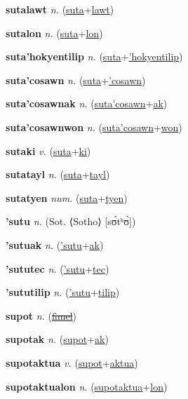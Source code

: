 \textbf{\hypertarget{sutalawt}{sutalawt}} \textit{n.} (\hyperlink{suta}{suta}+\allowbreak \hyperlink{lawt}{lawt})


\textbf{\hypertarget{sutalon}{sutalon}} \textit{n.} (\hyperlink{suta}{suta}+\allowbreak \hyperlink{lon}{lon})


\textbf{\hypertarget{suta'hokyentilip}{suta'hokyentilip}} \textit{n.} (\hyperlink{suta}{suta}+\allowbreak \hyperlink{'hokyentilip}{'hokyentilip})


\textbf{\hypertarget{suta'cosawn}{suta'cosawn}} \textit{n.} (\hyperlink{suta}{suta}+\allowbreak \hyperlink{'cosawn}{'cosawn})


\textbf{\hypertarget{suta'cosawnak}{suta'cosawnak}} \textit{n.} (\hyperlink{suta'cosawn}{suta'cosawn}+\allowbreak \hyperlink{ak}{ak})


\textbf{\hypertarget{suta'cosawnwon}{suta'cosawnwon}} \textit{n.} (\hyperlink{suta'cosawn}{suta'cosawn}+\allowbreak \hyperlink{won}{won})


\textbf{\hypertarget{sutaki}{sutaki}} \textit{v.} (\hyperlink{suta}{suta}+\allowbreak \hyperlink{ki}{ki})


\textbf{\hypertarget{sutatayl}{sutatayl}} \textit{n.} (\hyperlink{suta}{suta}+\allowbreak \hyperlink{tayl}{tayl})


\textbf{\hypertarget{sutatyen}{sutatyen}} \textit{num.} (\hyperlink{suta}{suta}+\allowbreak \hyperlink{tyen}{tyen})


\textbf{\hypertarget{'sutu}{'sutu}} \textit{n.} (Sot. ⟨Sotho⟩ [sʊ́tʰʊ̀])


\textbf{\hypertarget{'sutuak}{'sutuak}} \textit{n.} (\hyperlink{'sutu}{'sutu}+\allowbreak \hyperlink{ak}{ak})


\textbf{\hypertarget{'sututec}{'sututec}} \textit{n.} (\hyperlink{'sutu}{'sutu}+\allowbreak \hyperlink{tec}{tec})


\textbf{\hypertarget{'sututilip}{'sututilip}} \textit{n.} (\hyperlink{'sutu}{'sutu}+\allowbreak \hyperlink{tilip}{tilip})


\textbf{\hypertarget{supot}{supot}} \textit{n.} (\hyperlink{fimel}{\sout{fimel}})


\textbf{\hypertarget{supotak}{supotak}} \textit{n.} (\hyperlink{supot}{supot}+\allowbreak \hyperlink{ak}{ak})


\textbf{\hypertarget{supotaktua}{supotaktua}} \textit{v.} (\hyperlink{supot}{supot}+\allowbreak \hyperlink{aktua}{aktua})


\textbf{\hypertarget{supotaktualon}{supotaktualon}} \textit{n.} (\hyperlink{supotaktua}{supotaktua}+\allowbreak \hyperlink{lon}{lon})


